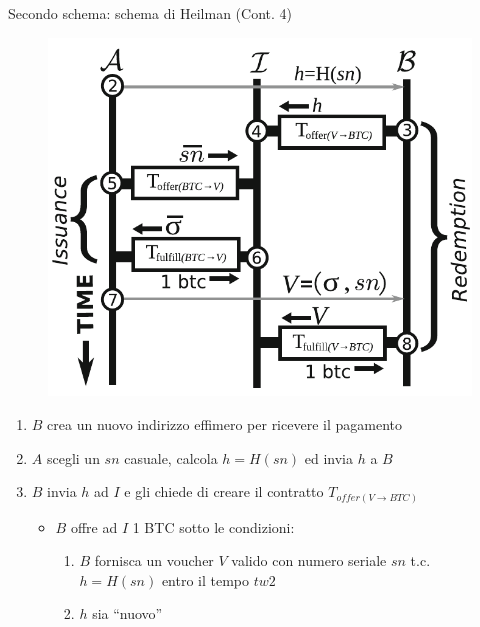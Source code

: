 \documentclass{beamer}
\begin{document}
  
  \begin{frame}{Secondo schema: schema di Heilman (Cont. 4)}
      \begin{figure}
          \centering
          \includegraphics[width=0.4\linewidth]{../img/heilman-scheme.png}
      \end{figure}
      
      \begin{enumerate}
          \item $B$ crea un nuovo indirizzo effimero per ricevere il pagamento \pause
          \item $A$ scegli un $sn$ casuale, calcola $h=H(sn)$ ed invia $h$ a $B$ \pause
          \item $B$ invia $h$ ad $I$ e gli chiede di creare il contratto $T_{offer(V\rightarrow BTC)}$
          \begin{itemize}
              \item[\MVRightarrow] $B$ offre ad $I$ 1 BTC sotto le condizioni: 
              \begin{enumerate}
                  \item $B$ fornisca un voucher $V$ valido con numero seriale $sn$ t.c. $h=H(sn)$ entro il tempo $tw2$
                  \item $h$ sia ``nuovo''
              \end{enumerate}
          \end{itemize}
      \end{enumerate}
  \end{frame}
  
  
  
\end{document}
